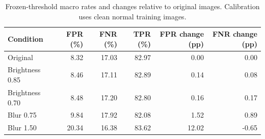 \begin{table}[htbp]
\caption{Frozen-threshold macro rates and changes relative to original images. Calibration uses clean normal training images.}
\label{tab:threshold_calibration}
\begin{tabular}{lrrrrr}
\toprule
Condition & FPR (\%) & FNR (\%) & TPR (\%) & FPR change (pp) & FNR change (pp) \\
\midrule
Original & 8.32 & 17.03 & 82.97 & 0.00 & 0.00 \\
Brightness 0.85 & 8.46 & 17.11 & 82.89 & 0.14 & 0.08 \\
Brightness 0.70 & 8.48 & 17.20 & 82.80 & 0.16 & 0.17 \\
Blur 0.75 & 9.84 & 17.92 & 82.08 & 1.52 & 0.89 \\
Blur 1.50 & 20.34 & 16.38 & 83.62 & 12.02 & -0.65 \\
\bottomrule
\end{tabular}
\end{table}
